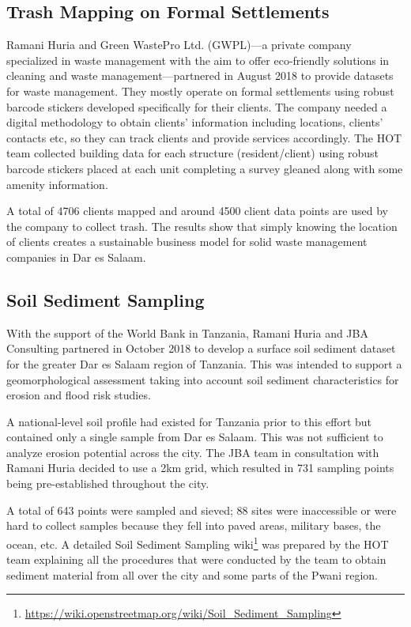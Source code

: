 \documentclass[a4paper,12pt,twoside]{article}
\begin{document}
\subsection{Trash Mapping on Formal Settlements}

Ramani Huria and Green WastePro Ltd. (GWPL)---a private company specialized in waste management with the aim to offer eco-friendly solutions in cleaning and waste management---partnered in August 2018 to provide datasets for waste management. They mostly operate on formal settlements using robust barcode stickers developed specifically for their clients. The company needed a digital methodology to obtain clients’ information including locations, clients' contacts etc, so they can track clients and provide services accordingly. The HOT team collected building data for each structure (resident/client) using robust barcode stickers placed at each unit completing a survey gleaned along with some amenity information. 

A total of 4706 clients mapped and around 4500 client data points are used by the company to collect trash. The results show that simply knowing the location of clients creates a sustainable business model  for solid waste management companies in Dar es Salaam. 

\subsection{Soil Sediment Sampling}

With the support of the World Bank in Tanzania, Ramani Huria and JBA Consulting partnered in October 2018 to develop a surface soil sediment dataset for the greater Dar es Salaam region of Tanzania. This was intended to support a geomorphological assessment taking into account soil sediment characteristics for erosion and flood risk studies.

A national-level soil profile had existed for Tanzania prior to this effort but contained only a single sample from Dar es Salaam. This was not sufficient to analyze erosion potential across the city. The JBA team in consultation with Ramani Huria decided to use a 2km grid, which resulted in 731 sampling points being pre-established throughout the city.

A total of 643 points were sampled and sieved; 88 sites were inaccessible or were hard to collect samples because they fell into paved areas, military bases, the ocean, etc. A detailed Soil Sediment Sampling wiki\footnote{\url{ https://wiki.openstreetmap.org/wiki/Soil_Sediment_Sampling}} was prepared by the HOT team explaining all the procedures that were conducted by the team to obtain sediment material from all over the city and some parts of the Pwani region.
\end{document}
